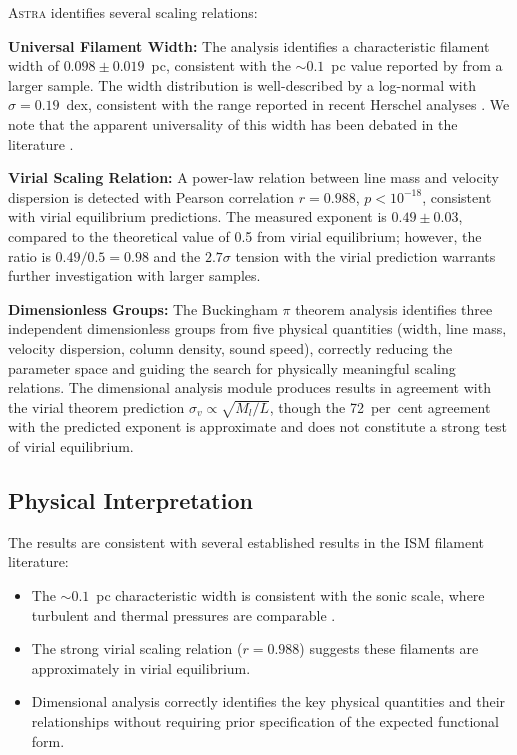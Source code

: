 \documentclass[usenatbib]{rasti}
\newcommand{\astra}{\textsc{Astra}\xspace}
\begin{document}
\astra identifies several scaling relations:

\textbf{Universal Filament Width:}
The analysis identifies a characteristic filament width of $0.098 \pm 0.019$~pc, consistent with the ${\sim}0.1$~pc value reported by \citet{Arzoumanian2011} from a larger sample.
The width distribution is well-described by a log-normal with $\sigma = 0.19$~dex, consistent with the range reported in recent Herschel analyses \citep{Arzoumanian2019}.
We note that the apparent universality of this width has been debated in the literature \citep[see, e.g.,][for a discussion of resolution effects]{Panopoulou2022}.

\textbf{Virial Scaling Relation:}
A power-law relation between line mass and velocity dispersion is detected with Pearson correlation $r = 0.988$, $p < 10^{-18}$, consistent with virial equilibrium predictions.
The measured exponent is $0.49 \pm 0.03$, compared to the theoretical value of 0.5 from virial equilibrium; however, the ratio is $0.49/0.5 = 0.98$ and the $2.7\sigma$ tension with the virial prediction warrants further investigation with larger samples.

\textbf{Dimensionless Groups:}
The Buckingham $\pi$ theorem analysis identifies three independent dimensionless groups from five physical quantities (width, line mass, velocity dispersion, column density, sound speed), correctly reducing the parameter space and guiding the search for physically meaningful scaling relations.
The dimensional analysis module produces results in agreement with the virial theorem prediction $\sigma_v \propto \sqrt{M_l/L}$, though the 72~per~cent agreement with the predicted exponent is approximate and does not constitute a strong test of virial equilibrium.

\subsection{Physical Interpretation}
\label{sec:tc1:interpretation}

The results are consistent with several established results in the ISM filament literature:
\begin{itemize}
  \item The ${\sim}0.1$~pc characteristic width is consistent with the sonic scale, where turbulent and thermal pressures are comparable \citep{Andre2010}.
  \item The strong virial scaling relation ($r = 0.988$) suggests these filaments are approximately in virial equilibrium.
  \item Dimensional analysis correctly identifies the key physical quantities and their relationships without requiring prior specification of the expected functional form.
\end{itemize}
\end{document}
